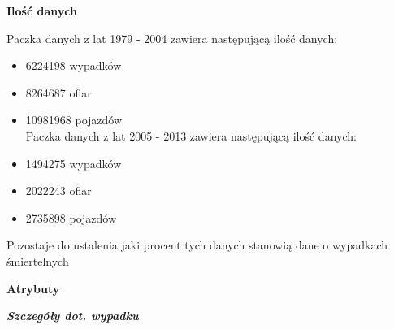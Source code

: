 \textbf{Ilość danych}

Paczka danych z lat 1979 - 2004 zawiera następującą ilość danych:

\begin{itemize}
\itemsep1pt\parskip0pt
\item
  6224198 wypadków\\
\item
  8264687 ofiar\\
\item
  10981968 pojazdów\\Paczka danych z lat 2005 - 2013 zawiera następującą
  ilość danych:\\
\item
  1494275 wypadków\\
\item
  2022243 ofiar\\
\item
  2735898 pojazdów
\end{itemize}

Pozostaje do ustalenia jaki procent tych danych stanowią dane o
wypadkach śmiertelnych

\textbf{Atrybuty}

\textbf{\emph{Szczegóły dot. wypadku}}

